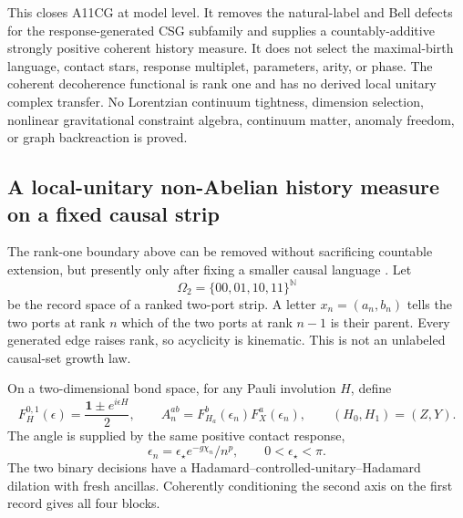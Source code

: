 This closes A11CG at model level.  It removes the natural-label and Bell
defects for the response-generated CSG subfamily and supplies a
countably-additive strongly positive coherent history measure.  It does not
select the maximal-birth language, contact stars, response multiplet,
parameters, arity, or phase.  The coherent decoherence functional is rank
one and has no derived local unitary complex transfer.  No Lorentzian
continuum tightness, dimension selection, nonlinear gravitational
constraint algebra, continuum matter, anomaly freedom, or graph
backreaction is proved.

\subsection{A local-unitary non-Abelian history measure on a fixed causal
strip}
\label{sec:nonabelian-history-measure}

The rank-one boundary above can be removed without sacrificing countable
extension, but presently only after fixing a smaller causal language
\cite{XuNonAbelianQuantumHistory2026}.  Let
\[
 \Omega_2=\{00,01,10,11\}^{\mathbb N}
\]
be the record space of a ranked two-port strip.  A letter
\(x_n=(a_n,b_n)\) tells the two ports at rank \(n\) which of the two
ports at rank \(n-1\) is their parent.  Every generated edge raises rank,
so acyclicity is kinematic.  This is not an unlabeled causal-set growth law.

On a two-dimensional bond space, for any Pauli involution \(H\), define
\[
 F_H^{0,1}(\epsilon)=\frac{\mathbf 1\pm e^{i\epsilon H}}{2},
 \qquad
 A_n^{ab}=F_{H_a}^{b}(\epsilon_n)F_X^a(\epsilon_n),
 \qquad (H_0,H_1)=(Z,Y).
\]
The angle is supplied by the same positive contact response,
\[
 \epsilon_n=\epsilon_\star e^{-g\chi_n}/n^p,
 \qquad 0<\epsilon_\star<\pi.
\]
The two binary decisions have a Hadamard--controlled-unitary--Hadamard
dilation with fresh ancillas.  Coherently conditioning the second axis on
the first record gives all four blocks.

